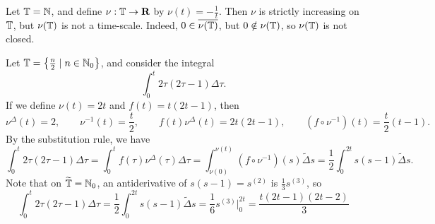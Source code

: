 \documentclass[nonumber]{homework}
\begin{document}
	
	Let $\mathbb{T} = \mathbb{N}$, and define $\nu : \mathbb{T} \to \textnormal{\bf R}$ by $\nu(t) = -\frac{1}{t}$. Then $\nu$ is strictly increasing on $\mathbb{T}$, but $\nu(\mathbb{T})$ is not a time-scale. Indeed, $0 \in \overline{\nu(\mathbb{T})}$, but $0 \notin \nu(\mathbb{T})$, so $\nu(\mathbb{T})$ is not closed.
	
	
	Let $\mathbb{T} = \left\{\frac{n}{2} \mid n \in \mathbb{N}_0\right\}$, and consider the integral
	\begin{equation*}
		\int_0^t 2\tau(2\tau -1)\Delta \tau.	
	\end{equation*}
	If we define $\nu(t) = 2t$ and $f(t) = t(2t-1)$, then
	\begin{equation*}
		\nu^\Delta(t) = 2, \qquad \nu^{-1}(t) = \frac{t}{2}, \qquad f(t)\nu^\Delta(t) = 2t(2t-1), \qquad \left(f\circ\nu^{-1}\right)(t) = \frac{t}{2}(t-1).
	\end{equation*}
	By the substitution rule, we have
	\begin{equation*}
		\int_0^t 2\tau(2\tau-1)\Delta \tau = \int_0^t f(\tau)\nu^\Delta(\tau)\Delta \tau = \int_{\nu(0)}^{\nu(t)} \left(f\circ \nu^{-1}\right)(s)\widetilde{\Delta} s = \frac{1}{2}\int_0^{2t}s(s-1)\widetilde{\Delta}s.
	\end{equation*}
	Note that on $\widetilde{\mathbb{T}} = \mathbb{N}_0$, an antiderivative of $s(s-1) = s^{(2)}$ is $\frac{1}{3}s^{(3)}$, so
	\begin{equation*}
		\int_0^t 2\tau(2\tau-1)\Delta \tau = \frac{1}{2}\int_0^{2t}s(s-1)\widetilde{\Delta}s = \frac{1}{6} s^{(3)}\bigg\vert_0^{2t} = \frac{t(2t-1)(2t-2)}{3}
	\end{equation*}
	
\end{document}
